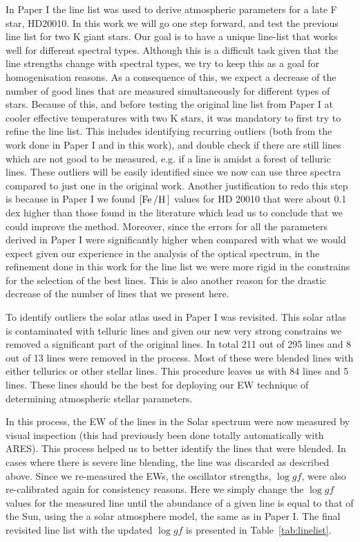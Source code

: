 \documentclass[a4paper,fleqn,usenatbib]{mnras}
\begin{document}
In Paper I the line list was used to derive atmospheric parameters for a late F star, HD20010. In this work we will go 
one step forward, and test the previous line list for two K giant stars.
Our goal is to have a unique line-list that works well for different spectral types. Although this
is a difficult task given that the line strengths change with spectral types, we try to keep this as
a goal for homogenisation reasons. As a consequence of this, we expect a decrease of the number 
of good lines that are measured simultaneously for different types of stars. Because of this, and before 
testing the original line list from Paper I at cooler effective temperatures with two K stars, it was mandatory to 
first try to refine the line list. This includes identifying recurring outliers (both from the work done
in Paper I and in this work), and double check if there are still lines which are not good to be measured, e.g. if 
a line is amidst a forest of telluric lines. These outliers will be easily identified since we now can use three spectra compared to just
one in the original work. Another justification to redo this step is because in Paper I we found
$[\ion{Fe}/\ion{H}]$ values for HD 20010 that were about 0.1 dex higher than those found in the
literature which lead us to conclude that we could improve the method. Moreover, since the errors for all the 
parameters derived in Paper I were significantly higher when compared with what we would expect given our experience in the analysis of the 
optical spectrum, in the refinement done in this work for the line list we were more rigid in the constrains for the selection of the best lines. This is also another reason for the drastic decrease of the number of lines that we present here.

To identify outliers the solar atlas used in Paper I was revisited. This solar atlas is contaminated with telluric lines and given our new very strong constrains we removed a significant part of the original lines. In total 211 out of 295  lines and 
8 out of 13  lines were removed in the process. Most of these were blended lines with either tellurics or other stellar
lines. This procedure leaves us with 84  lines and 5  lines. These lines
should be the best for deploying our EW technique of determining atmospheric stellar parameters.

In this process, the EW of the lines in the Solar spectrum were now measured by visual inspection (this had
previously been done totally automatically with ARES). This process helped us to better identify the lines that
were blended. In cases where there is severe line blending, the line was discarded as described
above. Since we re-measured the EWs, the oscillator strengths, $\log \mathit{gf}$, were also
re-calibrated again for consistency reasons. Here we simply change the $\log \mathit{gf}$ values for the measured line until
the abundance of a given line is equal to that of the Sun, using the a solar atmosphere model, the same as
in Paper I. The final revisited line list with the updated $\log \mathit{gf}$ is presented in Table~\ref{tab:linelist}.
\end{document}
